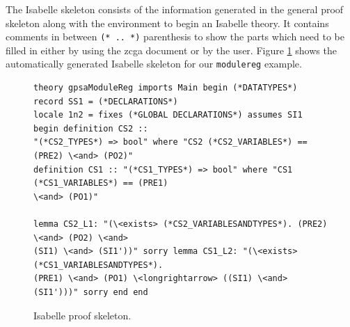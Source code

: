  The Isabelle skeleton consists of the information generated in the general
 proof skeleton along with the environment to begin an Isabelle theory. It
 contains comments in between \verb|(* .. *)| parenthesis to show the parts which
 need to be filled in either by using the \gls{zcga} document or by the user.
 Figure \ref{fig:isaFullexample} shows the automatically generated Isabelle
 skeleton for our \texttt{modulereg} example.

\begin{figure}[H]
\centering
\begin{scriptsize}
\begin{BVerbatim}
theory gpsaModuleReg imports Main begin (*DATATYPES*) record SS1 = (*DECLARATIONS*)
locale 1n2 = fixes (*GLOBAL DECLARATIONS*) assumes SI1 begin definition CS2 ::
"(*CS2_TYPES*) => bool" where "CS2 (*CS2_VARIABLES*) == (PRE2) \<and> (PO2)"
definition CS1 :: "(*CS1_TYPES*) => bool" where "CS1 (*CS1_VARIABLES*) == (PRE1)
\<and> (PO1)"

lemma CS2_L1: "(\<exists> (*CS2_VARIABLESANDTYPES*). (PRE2) \<and> (PO2) \<and>
(SI1) \<and> (SI1'))" sorry lemma CS1_L2: "(\<exists> (*CS1_VARIABLESANDTYPES*).
(PRE1) \<and> (PO1) \<longrightarrow> ((SI1) \<and> (SI1')))" sorry end end

\end{BVerbatim}
\end{scriptsize}
\caption{Isabelle proof skeleton. \label{fig:isaFullexample}}
\end{figure}


